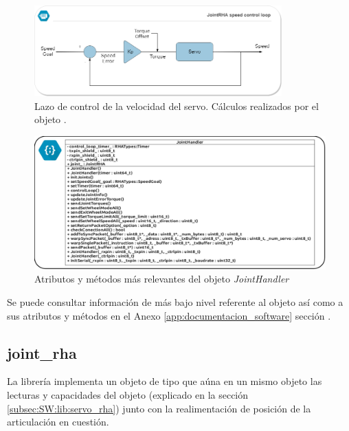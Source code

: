         \begin{figure}[H]
        \centering
        \includegraphics[width=0.85\textwidth]{figuras/Imagenes_SW/servo_control_loop.png}
        \caption{Lazo de control de la velocidad del servo. Cálculos realizados por el objeto .}
        \label{fig:SW:servo_control_loop}
        \end{figure}

        \begin{figure}[H]
            \centering
            \includegraphics[width=1\textwidth]{figuras/Imagenes_SW/class_diagram_JH.jpg}
            \caption{Atributos y métodos más relevantes del objeto \textit{JointHandler}}
            \label{fig:SW:class_diagram_JH}
        \end{figure}

        Se puede consultar información de más bajo nivel referente al objeto  así como a sus atributos y métodos en el Anexo \ref{app:documentacion_software} sección \completar.

    \subsection{joint\_rha} \label{subsec:SW:lib:joint_rha}
        La librería  implementa un objeto de tipo  que aúna en un mismo objeto las lecturas y capacidades del objeto  (explicado en la sección \ref{subsec:SW:lib:servo_rha}) junto con la realimentación de posición de la articulación en cuestión.

